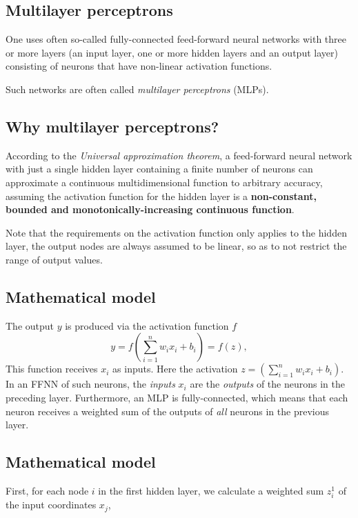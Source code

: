 \documentclass[%
oneside,                 %
final,                   %
10pt]{article}
\begin{document}
\subsection{Multilayer perceptrons}

One uses often so-called fully-connected feed-forward neural networks
with three or more layers (an input layer, one or more hidden layers
and an output layer) consisting of neurons that have non-linear
activation functions.

Such networks are often called \emph{multilayer perceptrons} (MLPs).

\subsection{Why multilayer perceptrons?}

According to the \emph{Universal approximation theorem}, a feed-forward
neural network with just a single hidden layer containing a finite
number of neurons can approximate a continuous multidimensional
function to arbitrary accuracy, assuming the activation function for
the hidden layer is a \textbf{non-constant, bounded and
monotonically-increasing continuous function}.

Note that the requirements on the activation function only applies to
the hidden layer, the output nodes are always assumed to be linear, so
as to not restrict the range of output values.


\subsection{Mathematical model}

The output $y$ is produced via the activation function $f$
\[
 y = f\left(\sum_{i=1}^n w_ix_i + b_i\right) = f(z),
\]
This function receives $x_i$ as inputs.
Here the activation $z=(\sum_{i=1}^n w_ix_i+b_i)$. 
In an FFNN of such neurons, the \emph{inputs} $x_i$ are the \emph{outputs} of
the neurons in the preceding layer. Furthermore, an MLP is
fully-connected, which means that each neuron receives a weighted sum
of the outputs of \emph{all} neurons in the previous layer.

\subsection{Mathematical model}

First, for each node $i$ in the first hidden layer, we calculate a weighted sum $z_i^1$ of the input coordinates $x_j$,
\end{document}
